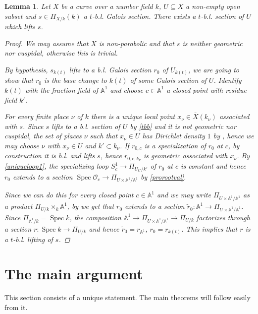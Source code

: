 \documentclass[11pt]{amsart}
\theoremstyle{plain}
\newtheorem{lemma}[theorem]{Lemma}
\theoremstyle{definition}
\newcommand{\on}{\operatorname}
\newcommand{\1}{\mathbb{1}}
\newcommand{\A}{\mathbb{A}}
\newcommand{\mc}{\mathcal}
\newcommand{\s}{\subseteq}
\newcommand{\spec}{\on{Spec}}
\renewcommand{\O}{\mc{O}}
\renewcommand{\tilde}{\widetilde}
\begin{document}
\begin{lemma}\label{nflift}
	Let $X$ be a curve over a number field $k$, $U\s X$ a non-empty open subset and $s\in\Pi_{X/k}(k)$ a $t$-b.l. Galois section. There exists a $t$-b.l. section of $U$ which lifts $s$.
	\begin{proof}
		We may assume that $X$ is non-parabolic and that $s$ is neither geometric nor cuspidal, otherwise this is trivial. 
		
		By hypothesis, $s_{k(t)}$ lifts to a b.l. Galois section $r_{0}$ of $U_{k(t)}$, we are going to show that $r_{0}$ is the base change to $k(t)$ of some Galois section of $U$. Identify $k(t)$ with the fraction field of $\A^{1}$ and choose $c\in \A^{1}$ a closed point with residue field $k'$.
  
        For every finite place $\nu$ of $k$ there is a unique local point $x_{\nu}\in\bar{X}(k_{\nu})$ associated with $s$. Since $s$ lifts to a b.l. section of $U$ by \autoref{tbb} and it is not geometric nor cuspidal, the set of places $\nu$ such that $x_{\nu}\in U$ has Dirichlet density $1$ by \cite[Theorem B]{sti15}, hence we may choose $\nu$ with $x_{\nu}\in U$ and $k'\subset k_{\nu}$. If $r_{0,c}$ is a specialization of $r_{0}$ at $c$, by construction it is b.l. and lifts $s$, hence $r_{0,c,k_{\nu}}$ is geometric associated with $x_{\nu}$. By \autoref{uniqueloop1}, the specializing loop $S^{1}_{c}\to\Pi_{U_{k'}/k'}$ of $r_{0}$ at $c$ is constant and hence $r_{0}$ extends to a section $\spec\O_{c}\to\Pi_{U\times\A^{1}/\A^{1}}$ by \autoref{prorootval}.
		
		Since we can do this for every closed point $c\in\A^{1}$ and we may write $\Pi_{U\times\A^{1}/\A^{1}}$ as a product $\Pi_{U/k}\times_{k}\A^{1}$, by \cite[Corollary A.3]{fed} we get that $r_{0}$ extends to a section $\tilde{r}_{0}:\A^{1}\to\Pi_{U\times\A^{1}/\A^{1}}$. Since $\Pi_{\A^{1}/k}=\spec k$, the composition $\A^{1}\to\Pi_{U\times\A^{1}/\A^{1}}\to\Pi_{U/k}$ factorizes through a section $r:\spec k\to\Pi_{U/k}$ and hence $\tilde{r}_{0}=r_{\A^{1}}$, $r_{0}=r_{k(t)}$. This implies that $r$ is a $t$-b.l. lifting of $s$.
	\end{proof}
\end{lemma}



\section{The main argument}

This section consists of a unique statement. The main theorems will follow easily from it.
\end{document}
